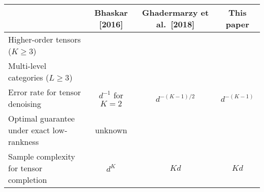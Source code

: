 \documentclass[11pt]{article}
\newcommand{\cmark}{\ding{51}}%
\newcommand{\xmark}{\ding{55}}%
\begin{document}
\begin{table}
\normalsize
\begin{tabular}{l|ccc}
&Bhaskar [2016]&Ghadermarzy et al.\ [2018] &This paper\\
\hline 
Higher-order tensors ($K\geq 3$) & \xmark&\cmark& \cmark\\
\hline
Multi-level categories ($L\geq 3$)& \cmark& \xmark&\cmark\\
 \hline
 Error rate for tensor denoising&$d^{-1}$ for $K=2$& $d^{-(K-1)/2}$&$d^{-(K-1)}$\\
\hline
Optimal guarantee under exact low-rankness& unknown & \xmark & \cmark\\
\hline
Sample complexity for tensor completion&$d^K$& $Kd$&$Kd$\\
\hline
\end{tabular}
\end{table}

%

\end{document}
